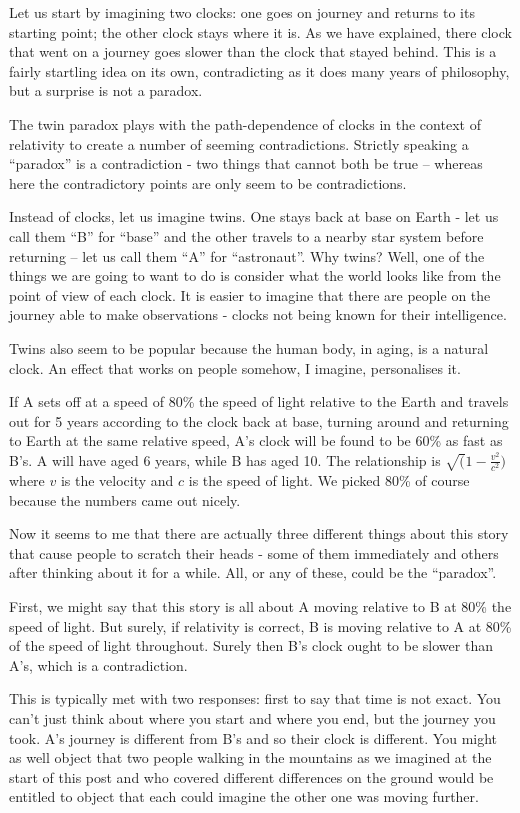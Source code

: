 \documentclass{report}
\begin{document}
Let us start by imagining two clocks: one goes on journey and returns to its starting point; the other clock stays where it is. As we have explained, there clock that went on a journey goes slower than the clock that stayed behind. This is a fairly startling idea on its own, contradicting as it does many years of philosophy, but a surprise is not a paradox.

The twin paradox plays with the path-dependence of clocks in the context of relativity to create a number of seeming contradictions. Strictly speaking a ``paradox'' is a contradiction - two things that cannot both be true -- whereas here the contradictory points are only seem to be contradictions.

Instead of clocks, let us imagine twins. One stays back at base on Earth - let us call them ``B'' for ``base'' and the other travels to a nearby star system before returning -- let us call them ``A'' for ``astronaut''. Why twins? Well, one of the things we are going to want to do is consider what the world looks like from the point of view of each clock. It is easier to imagine that there are people on the journey able to make observations - clocks not being known for their intelligence.

Twins also seem to be popular because the human body, in aging, is a natural clock. An effect that works on people somehow, I imagine, personalises it.

If A sets off at a speed of 80\% the speed of light relative to the Earth and travels out for 5 years according to the clock back at base, turning around and returning to Earth at the same relative speed, A's clock will be found to be 60\% as fast as B's. A will have aged 6 years, while B has aged 10. The relationship is $\sqrt(1 - \frac{v^2}{c^2})$ where $v$ is the velocity and $c$ is the speed of light. We picked 80\% of course because the numbers came out nicely.

Now it seems to me that there are actually three different things about this story that cause people to scratch their heads - some of them immediately and others after thinking about it for a while. All, or any of these, could be the ``paradox''.

First, we might say that this story is all about A moving relative to B at 80\% the speed of light. But surely, if relativity is correct, B is moving relative to A at 80\% of the speed of light throughout. Surely then B's clock ought to be slower than A's, which is a contradiction.

This is typically met with two responses: first to say that time is not exact. You can't just think about where you start and where you end, but the journey you took. A's journey is different from B's and so their clock is different. You might as well object that two people walking in the mountains as we imagined at the start of this post and who covered different differences on the ground would be entitled to object that each could imagine the other one was moving further.
\end{document}
